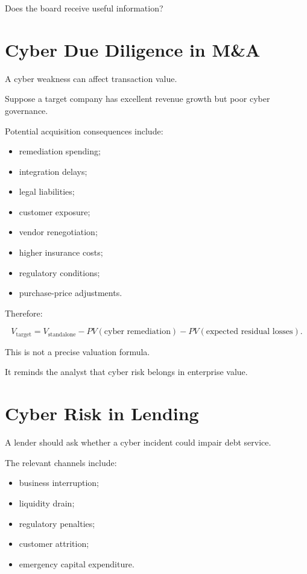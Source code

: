 Does the board receive useful information?

\section{Cyber Due Diligence in M\&A}

A cyber weakness can affect transaction value.

Suppose a target company has excellent revenue growth but poor cyber governance.

Potential acquisition consequences include:

\begin{itemize}
    \item remediation spending;
    \item integration delays;
    \item legal liabilities;
    \item customer exposure;
    \item vendor renegotiation;
    \item higher insurance costs;
    \item regulatory conditions;
    \item purchase-price adjustments.
\end{itemize}

Therefore:

\begin{equation}
V_{\text{target}}
=
V_{\text{standalone}}
-
PV(\text{cyber remediation})
-
PV(\text{expected residual losses}).
\end{equation}

This is not a precise valuation formula.

It reminds the analyst that cyber risk belongs in enterprise value.

\section{Cyber Risk in Lending}

A lender should ask whether a cyber incident could impair debt service.

The relevant channels include:

\begin{itemize}
    \item business interruption;
    \item liquidity drain;
    \item regulatory penalties;
    \item customer attrition;
    \item emergency capital expenditure.
\end{itemize}

